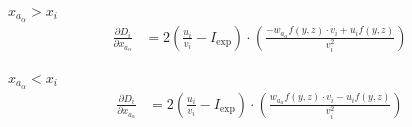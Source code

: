 \documentclass{article}
\begin{document}
$x_{a_\alpha} > x_i$
\begin{align*}
\frac{\partial D_i}{\partial x_{a_\alpha}} &= 2\left(\frac{u_i}{v_i} - I_{\mathrm{exp}}\right)\cdot \left(\frac{-w_{a_\alpha}f(y,z)\cdot v_i + u_i f(y,z)}{v_i^2}\right)\\
\end{align*}

$x_{a_\alpha} < x_i$
\begin{align*}
\frac{\partial D_i}{\partial x_{a_\alpha}} &= 2\left(\frac{u_i}{v_i} - I_{\mathrm{exp}}\right)\cdot \left(\frac{w_{a_\alpha}f(y,z)\cdot v_i - u_i f(y,z)}{v_i^2}\right)\\
\end{align*}
\end{document}
